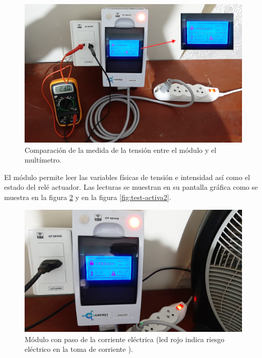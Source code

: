 \begin{figure}[htpb]
\centering 
\includegraphics[width=1.0\textwidth]{./Figures/test/consumo/tension2.png}
\caption{Comparación de la medida de la tensión entre el módulo y el multímetro.}
\label{fig:test-tension}
\end{figure}

El módulo permite leer las variables físicas de tensión e intensidad así como el estado del relé actuador. Las lecturas se muestran en su pantalla gráfica como se muestra en la figura \ref{fig:test-activa1} y en la figura \ref{fig:test-activa2}.
\vspace{0.5cm}
\begin{figure}[htpb]
\centering 
\includegraphics[width=1.0\textwidth]{./Figures/test/consumo/paso.png}
\caption{Módulo con paso de la corriente eléctrica (led rojo indica riesgo eléctrico en la toma de corriente ).}
\label{fig:test-activa1}
\end{figure}

